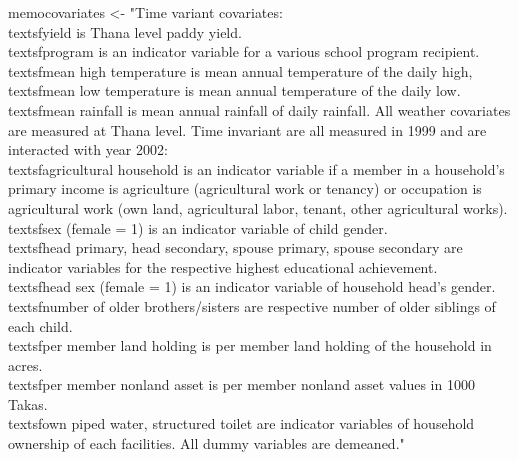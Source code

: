 \begin{Schunk}
\begin{Sinput}
memocovariates <- "Time variant covariates: \\textsf{yield} is Thana level paddy yield. \\textsf{program} is an indicator variable for a various school program recipient. \\textsf{mean high temperature} is mean annual temperature of the daily high, \\textsf{mean low temperature} is mean annual temperature of the daily low. \\textsf{mean rainfall} is mean annual rainfall of daily rainfall. All weather covariates are measured at Thana level. Time invariant are all measured in 1999 and are interacted with year 2002: \\textsf{agricultural household} is an indicator variable if a member in a household's primary income is agriculture (agricultural work or tenancy) or occupation is agricultural work (own land, agricultural labor, tenant, other agricultural works). \\textsf{sex (female = 1)} is an indicator variable of child gender. \\textsf{head primary, head secondary, spouse primary, spouse secondary} are indicator variables for the respective highest educational achievement. \\textsf{head sex (female = 1)} is an indicator variable of household head's gender. \\textsf{number of older brothers/sisters} are respective number of older siblings of each child. \\textsf{per member land holding} is per member land holding of the household in acres. \\textsf{per member nonland asset} is per member nonland asset values in 1000 Takas. \\textsf{own piped water, structured toilet} are indicator variables of household ownership of each facilities. All dummy variables are demeaned." 

\end{Sinput}
\end{Schunk}
